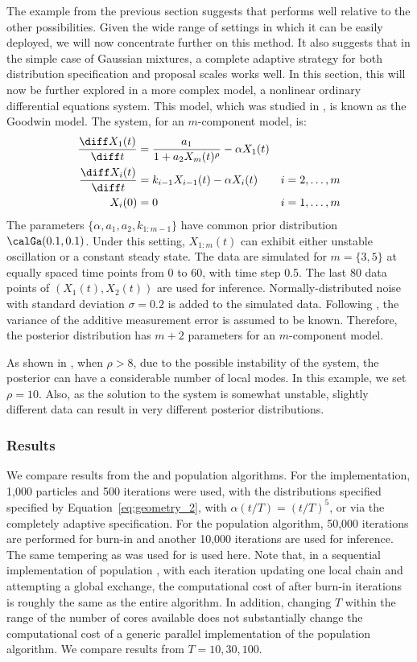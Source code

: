 The example from the previous section suggests that \smc[2] performs well
relative to the other \smc possibilities. Given the wide range of settings
in which it can be easily deployed, we will now concentrate
further on this method. It also suggests that in the simple case of Gaussian
mixtures, a complete adaptive strategy for both distribution specification
and proposal scales works well. In this section, this will now be further
explored in a more complex model, a nonlinear ordinary differential equations
system. This model, which was studied in \cite{Calderhead:2009bd}, is known
as the Goodwin model. The \ode system, for an $m$-component model, is:
\begin{align*}
  \frac{\diff X_1(t)}{\diff t} &= \frac{a_1}{1 + a_2 X_m(t)^{\rho}}
  - \alpha X_1(t)  & \\
  \frac{\diff X_i(t)}{\diff t} &= k_{i-1}X_{i-1}(t) - \alpha X_i(t)
  & i = 2,\dots,m \\
  X_i(0) &= 0 & i = 1,\dots,m
\end{align*}
The parameters $\{\alpha,a_1,a_2,k_{1:m-1}\}$ have common prior distribution
$\calGa(0.1, 0.1)$. Under this setting, $X_{1:m}(t)$ can exhibit either
unstable oscillation or a constant steady state. The data are simulated for
$m=\{3,5\}$ at equally spaced time points from 0 to 60, with time step 0.5.
The last 80 data points of $(X_1(t), X_2(t))$ are used for inference.
Normally-distributed noise with standard  deviation $\sigma=0.2$ is added to
the simulated data. Following \cite{Calderhead:2009bd}, the variance of the
additive measurement error is assumed to be known. Therefore, the posterior
distribution has $m+2$ parameters for an $m$-component model.

As shown in \cite{Calderhead:2009bd}, when $\rho > 8$, due to the possible
instability of the \ode system, the posterior can have a considerable number
of local modes. In this example, we set $\rho = 10$. Also, as the solution to
the \ode system is somewhat unstable, slightly different data can result in
very different posterior distributions.

\subsubsection{Results}

We compare results from the \smc[2] and population \mcmc algorithms. For the
\smc implementation, 1,000 particles and 500 iterations were used, with the
distributions specified specified by Equation~\eqref{eq:geometry_2}, with
$\alpha(t/T) = (t/T)^5$, or via the completely adaptive specification. For the
population \mcmc algorithm, 50,000 iterations are performed for burn-in and
another 10,000 iterations are used for inference. The same tempering as was
used for \smc is used here. Note that, in a sequential implementation of
population \mcmc, with each iteration updating one local chain and attempting
a global exchange, the computational cost of after burn-in iterations is
roughly the same as the entire \smc algorithm. In addition, changing $T$
within the range of the number of cores available does not substantially
change the computational cost of a generic parallel implementation of the
population \mcmc algorithm. We compare results from $T = 10,30,100$.

